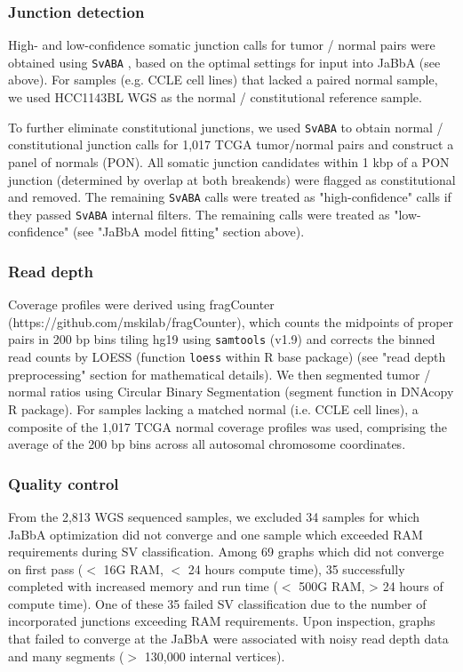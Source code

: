 \documentclass[phd,tocprelim]{cornell}
\begin{document}
\subsubsection*{Junction detection}

High- and low-confidence somatic junction calls for tumor / normal pairs were obtained using \texttt{SvABA} \cite{wala2018}, based on the optimal settings for input into JaBbA (see above). For samples (e.g. CCLE cell lines) that lacked a paired normal sample, we used HCC1143BL WGS as the normal / constitutional reference sample.

To further eliminate constitutional junctions, we used \texttt{SvABA} to obtain normal / constitutional junction calls for 1,017 TCGA tumor/normal pairs and construct a panel of normals (PON).  All somatic junction candidates within 1 kbp of a PON junction (determined by overlap at both breakends) were flagged as constitutional and removed.  The remaining \texttt{SvABA} calls were treated as "high-confidence" calls if they passed \texttt{SvABA} internal filters.  The remaining calls were treated as "low-confidence" (see "JaBbA model fitting" section above).

\subsubsection*{Read depth} \label{meth:readDepth}
Coverage profiles were derived using fragCounter (https://github.com/mskilab/fragCounter), which counts the midpoints of proper pairs in 200 bp bins tiling hg19 using \texttt{samtools} (v1.9) and corrects the binned read counts by LOESS (function \texttt{loess} within R base package) (see "read depth preprocessing" section for mathematical details). We then segmented tumor / normal ratios using Circular Binary Segmentation \cite{olshen2004} (segment function in DNAcopy R package). For samples lacking a matched normal (i.e. CCLE cell lines), a composite of the 1,017 TCGA normal coverage profiles was used, comprising the average of the 200 bp bins across all autosomal chromosome coordinates.

\subsubsection*{Quality control}
From the 2,813 WGS sequenced samples, we excluded 34 samples for which JaBbA optimization did not converge and one sample which exceeded RAM requirements during SV classification. Among 69 graphs which did not converge on first pass ($<$ 16G RAM, $<$ 24 hours compute time), 35 successfully completed with increased memory and run time ($<$ 500G RAM, > 24 hours of compute time).  One of these 35 failed SV classification due to the number of incorporated junctions exceeding RAM requirements.  Upon inspection, graphs that failed to converge at the JaBbA were associated with noisy read depth data and many segments ($>$ 130,000 internal vertices).
\end{document}
